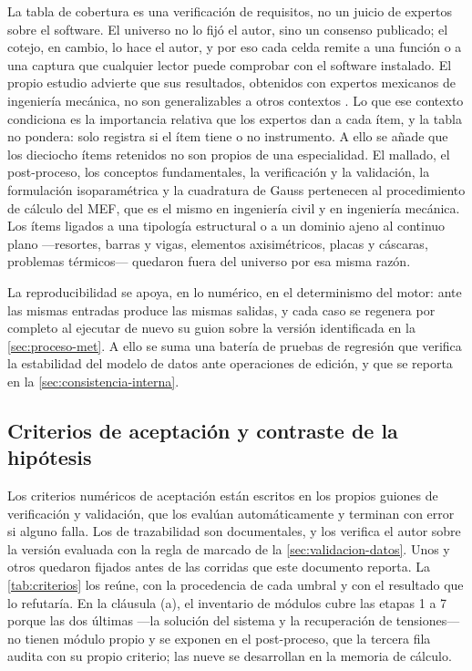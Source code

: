 La tabla de cobertura es una verificación de requisitos, no un juicio de expertos sobre el software. El universo no lo fijó el autor, sino un consenso publicado; el cotejo, en cambio, lo hace el autor, y por eso cada celda remite a una función o a una captura que cualquier lector puede comprobar con el software instalado. El propio estudio advierte que sus resultados, obtenidos con expertos mexicanos de ingeniería mecánica, no son generalizables a otros contextos \autocite[p.~1171]{perezsantiago2023fem}. Lo que ese contexto condiciona es la importancia relativa que los expertos dan a cada ítem, y la tabla no pondera: solo registra si el ítem tiene o no instrumento. A ello se añade que los dieciocho ítems retenidos no son propios de una especialidad. El mallado, el post-proceso, los conceptos fundamentales, la verificación y la validación, la formulación isoparamétrica y la cuadratura de Gauss pertenecen al procedimiento de cálculo del MEF, que es el mismo en ingeniería civil y en ingeniería mecánica. Los ítems ligados a una tipología estructural o a un dominio ajeno al continuo plano —resortes, barras y vigas, elementos axisimétricos, placas y cáscaras, problemas térmicos— quedaron fuera del universo por esa misma razón.

La reproducibilidad se apoya, en lo numérico, en el determinismo del motor: ante las mismas entradas produce las mismas salidas, y cada caso se regenera por completo al ejecutar de nuevo su guion sobre la versión identificada en la \autoref{sec:proceso-met}. A ello se suma una batería de pruebas de regresión que verifica la estabilidad del modelo de datos ante operaciones de edición, y que se reporta en la \autoref{sec:consistencia-interna}.

\subsection{Criterios de aceptación y contraste de la hipótesis}
\label{sec:validacion-resultados}

Los criterios numéricos de aceptación están escritos en los propios guiones de verificación y validación, que los evalúan automáticamente y terminan con error si alguno falla. Los de trazabilidad son documentales, y los verifica el autor sobre la versión evaluada con la regla de marcado de la \autoref{sec:validacion-datos}. Unos y otros quedaron fijados antes de las corridas que este documento reporta. La \autoref{tab:criterios} los reúne, con la procedencia de cada umbral y con el resultado que lo refutaría. En la cláusula (a), el inventario de módulos cubre las etapas 1 a 7 porque las dos últimas ---la solución del sistema y la recuperación de tensiones--- no tienen módulo propio y se exponen en el post-proceso, que la tercera fila audita con su propio criterio; las nueve se desarrollan en la memoria de cálculo.

